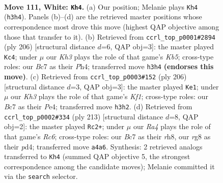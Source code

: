 \documentclass[11pt]{article}
\begin{document}
\clearpage

\begin{figure}[p]\centering
\begin{subfigure}{0.46\textwidth}\centering
\resizebox{\linewidth}{!}{%
\newchessgame
\chessboard[
  setfen={6r1/2B5/7k/8/R7/P6K/8/8 w - - 14 111},
  showmover=false,
  pgfstyle=straightmove, color=movearrow, markmove={h3-h4}
]}
\caption{}
\end{subfigure}\hfill
\begin{subfigure}{0.46\textwidth}\centering
\resizebox{\linewidth}{!}{%
\newchessgame
\chessboard[
  setfen={1R6/1P4k1/8/1K6/7P/8/1r6/8 w - - 19 104},
  showmover=false,
  pgfstyle=straightmove, color=movearrow, markmove={b5-c4}
]}
\caption{}
\end{subfigure}
\\[4pt]
\begin{subfigure}{0.46\textwidth}\centering
\resizebox{\linewidth}{!}{%
\newchessgame
\chessboard[
  setfen={8/8/8/R7/P3P3/6k1/3r4/5K2 w - - 0 104},
  showmover=false,
  pgfstyle=straightmove, color=movearrow, markmove={f1-e1}
]}
\caption{}
\end{subfigure}\hfill
\begin{subfigure}{0.46\textwidth}\centering
\resizebox{\linewidth}{!}{%
\newchessgame
\chessboard[
  setfen={7R/8/8/8/2pPk3/2r5/5K2/8 b - - 5 107},
  showmover=false,
  pgfstyle=straightmove, color=movearrow, markmove={c3-c2}
]}
\caption{}
\end{subfigure}
\caption{\textbf{Move 111, White: \texttt{Kh4}.} (a) Our position; Melanie plays \texttt{Kh4} (\texttt{h3h4}). Panels (b)--(d) are the retrieved master positions whose correspondence most drove this move (highest QAP objective among those that transfer to it). (b) Retrieved from \texttt{ccrl\_top\_p0001\#2894} (ply 206) [structural distance $d$=6, QAP obj=3]: the master played \texttt{Kc4}; under $\mu$ our \emph{Kh3} plays the role of that game's \emph{Kb5}; cross-type roles: our \emph{B}c7 as their \emph{P}h4; transferred move \texttt{h3h4} \textbf{(endorses this move)}. (c) Retrieved from \texttt{ccrl\_top\_p0003\#152} (ply 206) [structural distance $d$=3, QAP obj=3]: the master played \texttt{Ke1}; under $\mu$ our \emph{Kh3} plays the role of that game's \emph{Kf1}; cross-type roles: our \emph{B}c7 as their \emph{P}e4; transferred move \texttt{h3h2}. (d) Retrieved from \texttt{ccrl\_top\_p0002\#334} (ply 213) [structural distance $d$=8, QAP obj=2]: the master played \texttt{Rc2+}; under $\mu$ our \emph{Ra4} plays the role of that game's \emph{Rc6}; cross-type roles: our \emph{B}c7 as their \emph{r}h8, our \emph{r}g8 as their \emph{p}d4; transferred move \texttt{a4a6}. Synthesis: 2 retrieved analogs transferred to \texttt{Kh4} (summed QAP objective 5, the strongest correspondence among the candidate moves); Melanie committed it via the \texttt{search} selector.}
\label{fig:thought-m220}
\end{figure}
\end{document}

